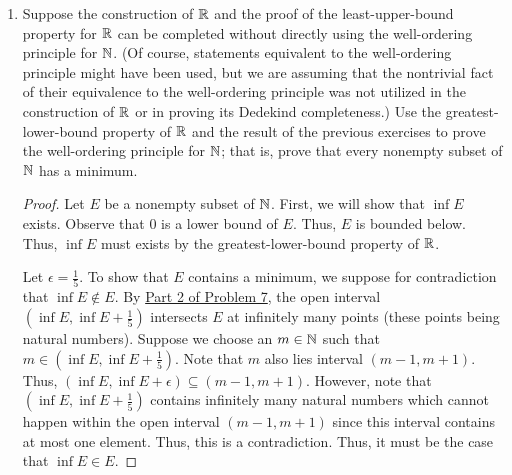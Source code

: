 \documentclass[11pt,a4paper]{article}
\begin{document}
\begin{enumerate}
\begin{enumerate}
\begin{proof}
    Now, we will show, through contradiction, that \( (\inf B, \inf B + \epsilon) \cap B \) contains infinitely many points. Suppose there exists an \( \epsilon > 0  \) such that \( (\inf B, \inf B + \epsilon) \) FINITELY many points. Denote these points by \( {b}_{i}  \) for \( 1 \leq i \leq n  \) in
    \[  (\inf B, \inf B + \epsilon) \cap B = \{ {b}_{i} : 1 \leq i \leq n   \}  \]
    For all \( 1 \leq k \leq n  \), let \( {d}_{k } = | \inf B - {b}_{k } |  \). Since \( {b}_{k } \in B  \) and \( \inf B \notin  B  \), we must have \( | \inf B - {b}_{k } | > 0  \). Let 
    \[  d = \frac{ \min \{ {d}_{1}, {d}_{2}, \dots, {d}_{n} \}  }{ 2 }. \]
    But this implies that none of the \( {b}_{i} \) for \( 1 \leq i \leq n   \) lies within the open interval \( (\inf B , \inf B + \epsilon) \). That is, the set 
    \[  (\inf B , \inf B + \epsilon) \cap B = \emptyset \]
    which is a contradiction. Thus, the open interval \( (\inf B, \inf B + \epsilon) \) must have infinitely many points.
    \end{proof}
\end{enumerate}

\item Suppose the construction of \( \mathbb{R}  \) and the proof of the least-upper-bound property for \( \mathbb{R}  \) can be completed without directly using the well-ordering principle for \( \mathbb{N}  \). (Of course, statements equivalent to the well-ordering principle might have been used, but we are assuming that the nontrivial fact of their equivalence to the well-ordering principle was not utilized in the construction of \( \mathbb{R}  \) or in proving its Dedekind completeness.) Use the greatest-lower-bound property of \( \mathbb{R}  \) and the result of the previous exercises to prove the well-ordering principle for \( \mathbb{N}  \); that is, prove that every nonempty subset of \( \mathbb{N}  \) has a minimum.
    \begin{proof}
    Let \( E  \) be a nonempty subset of \( \mathbb{N}  \). First, we will show that \( \inf E  \) exists. Observe that \( 0  \) is a lower bound of \( E  \). Thus, \( E  \) is bounded below. Thus, \( \inf E  \) must exists by the greatest-lower-bound property of \( \mathbb{R}  \).    

    Let \( \epsilon = \frac{ 1 }{ 5 }   \). To show that \( E  \) contains a minimum, we suppose for contradiction that \( \inf E \notin E  \). By {\hyperref[Problem 2]{Part 2 of Problem 7}}, the open interval \( (\inf E, \inf E + \frac{ 1 }{ 5 } ) \) intersects \( E  \) at infinitely many points (these points being natural numbers). Suppose we choose an \( m \in \mathbb{N} \) such that \( m  \in (\inf E , \inf E + \frac{ 1 }{ 5 }  ) \).  Note that \( m  \) also lies interval \( (m - 1, m + 1) \). Thus, \( (\inf E, \inf E + \epsilon) \subseteq (m-1,m+1) \). However, note that \( (\inf E, \inf E + \frac{ 1 }{ 5 }) \) contains infinitely many natural numbers which cannot happen within the open interval \( (m-1,m+1) \) since this interval contains at most one element. Thus, this is a contradiction. Thus, it must be the case that \( \inf E \in E  \).
\end{proof}


\end{enumerate}
\end{document}
